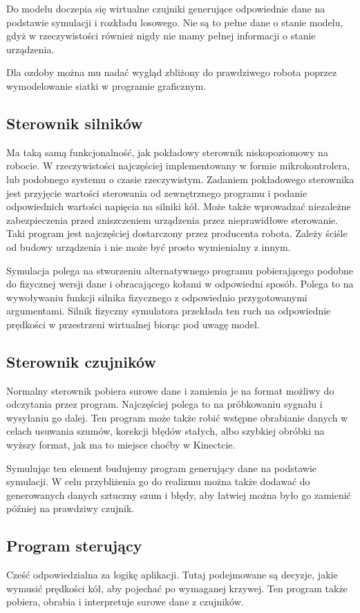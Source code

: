  Do modelu doczepia się wirtualne czujniki generujące odpowiednie dane na podstawie symulacji i rozkładu losowego.
 Nie są to pełne dane o stanie modelu, gdyż w rzeczywistości również nigdy nie mamy pełnej informacji o stanie urządzenia.
 
 Dla ozdoby można mu nadać wygląd zbliżony do prawdziwego robota poprzez wymodelowanie siatki w programie graficznym.

 \subsection{Sterownik silników}
 Ma taką samą funkcjonalność, jak pokładowy sterownik niskopoziomowy na robocie.
 W rzeczywistości najczęściej implementowany w formie mikrokontrolera, lub podobnego systemu o czasie rzeczywistym.
 Zadaniem pokładowego sterownika jest przyjęcie wartości sterowania od zewnętrznego programu i podanie odpowiednich wartości napięcia na silniki kół.
 Może także wprowadzać niezależne zabezpieczenia przed zniszczeniem urządzenia przez nieprawidłowe sterowanie.
 Taki program jest najczęściej dostarczony przez producenta robota.
 Zależy ściśle od budowy urządzenia i nie może być prosto wymienialny z innym.
 
 Symulacja polega na stworzeniu alternatywnego programu pobierającego podobne do fizycznej wersji dane i obracającego kołami w odpowiedni sposób.
 Polega to na wywoływaniu funkcji silnika fizycznego z odpowiednio przygotowanymi argumentami.
 Silnik fizyczny symulatora przekłada ten ruch na odpowiednie prędkości w przestrzeni wirtualnej biorąc pod uwagę model.
 
 \subsection{Sterownik czujników} %
 Normalny sterownik pobiera surowe dane i zamienia je na format możliwy do odczytania przez program.
 Najczęściej polega to na próbkowaniu sygnału i wysyłaniu go dalej.
 Ten program może także robić wstępne obrabianie danych w celach usuwania szumów, korekcji błędów stałych, albo szybkiej obróbki na wyższy format, jak ma to miejsce choćby w Kinectcie.
 
 Symulując ten element budujemy program generujący dane na podstawie symulacji. 
 W celu przybliżenia go do realizmu można także dodawać do generowanych danych sztuczny szum i błędy, aby łatwiej można było go zamienić później na prawdziwy czujnik.
 
\subsection{Program sterujący}
 Cześć odpowiedzialna za logikę aplikacji. Tutaj podejmowane są decyzje, jakie wymusić prędkości kół, aby pojechać po wymaganej krzywej.
 Ten program także pobiera, obrabia i interpretuje surowe dane z czujników.
 
